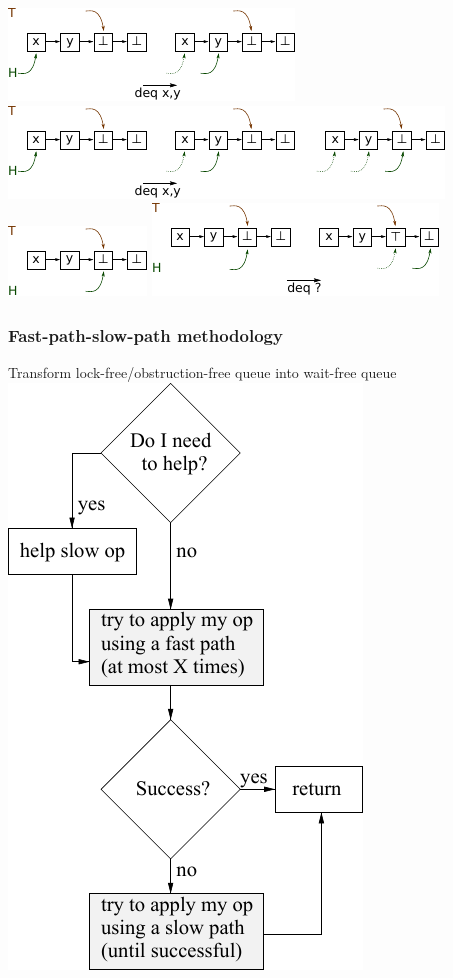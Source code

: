 \documentclass[10pt,a4paper]{beamer}
\begin{document}
\begin{frame}[fragile]
\begin{overprint}
   \includegraphics[scale=1.6]{img/q5.pdf}
   \includegraphics[scale=1.6]{img/q6.pdf}
   \includegraphics[scale=1.6]{img/q7.pdf}
   \includegraphics[scale=1.6]{img/q8.pdf}
\end{overprint}
\end{frame}

\begin{frame}
  \frametitle{Fast-path-slow-path methodology}
  \center
  Transform lock-free/obstruction-free queue into wait-free queue
  \vfill
  \includegraphics[scale=0.7]{../synthese/img/fpsp.pdf}
\end{frame}
\end{document}

